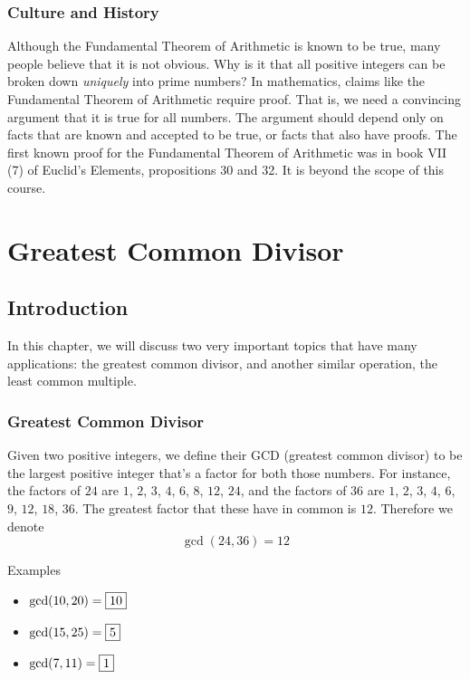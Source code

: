 \documentclass[a4paper,10pt]{report}
\begin{document}
\subsection{Culture and History}

Although the Fundamental Theorem of Arithmetic is known to be true, many people
believe that it is not obvious. Why is it that all positive integers can be
broken down \emph{uniquely} into prime numbers? In mathematics, claims like the
Fundamental Theorem of Arithmetic require proof. That is, we need a convincing
argument that it is true for all numbers. The argument should depend only on
facts that are known and accepted to be true, or facts that also have proofs.
The first known proof for the Fundamental Theorem of Arithmetic was in book VII
(7) of Euclid's Elements, propositions 30 and 32. It is beyond the scope of this
course.

\chapter{Greatest Common Divisor}

\section{Introduction}

In this chapter, we will discuss two very important
topics that have many applications: the greatest common divisor, and another
similar operation, the least common multiple.

\subsection{Greatest Common Divisor}

Given two positive integers, we define their GCD (greatest common divisor) to be
the largest positive integer that's a factor for both those numbers. For
instance, the factors of $24$ are $1$, $2$, $3$, $4$, $6$, $8$, $12$, $24$, and
the factors of $36$ are $1$, $2$, $3$, $4$, $6$, $9$, $12$, $18$, $36$. The
greatest factor that these have in common is $12$. Therefore we denote \[
 \gcd(24, 36) = 12
\]

\begin{problem}{Examples}
 \begin{itemize}
  \item $\gcd(10, 20) = \Ans{10}$
  \item $\gcd(15, 25) = \Ans{5}$
  \item $\gcd(7, 11) = \Ans{1}$
 \end{itemize}
\end{problem}
\end{document}
